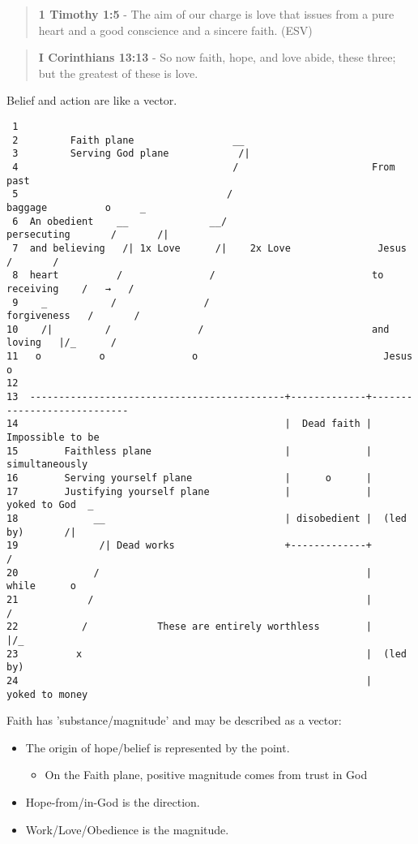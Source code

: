 \documentclass[11pt]{article}
\begin{document}
\begin{quote}
\textbf{1 Timothy 1:5} -  The aim of our charge is love that issues from a pure heart and a good conscience and a sincere faith.  (ESV)
\end{quote}

\begin{quote}
\textbf{I Corinthians 13:13} - So now faith, hope, and love abide, these three; but the greatest of these is love.
\end{quote}

Belief and action are like a vector.

\begin{verbatim}
 1  
 2         Faith plane                 __
 3         Serving God plane            /|
 4                                     /                       From past
 5                                    /                          baggage          o     _
 6  An obedient    __              __/                         persecuting       /       /|
 7  and believing   /| 1x Love      /|    2x Love               Jesus           /       /
 8  heart          /               /                           to receiving    /   →   /
 9    _           /               /                             forgiveness   /       /
10    /|         /               /                             and loving   |/_      /
11   o          o               o                                Jesus              o
12  
13  --------------------------------------------+-------------+----------------------------
14                                              |  Dead faith |    Impossible to be
15        Faithless plane                       |             |     simultaneously
16        Serving yourself plane                |      o      |
17        Justifying yourself plane             |             |   yoked to God  _
18             __                               | disobedient |  (led by)       /|
19              /| Dead works                   +-------------+                /
20             /                                              |    while      o
21            /                                               |              /
22           /            These are entirely worthless        |            |/_
23          x                                                 |  (led by)
24                                                            |   yoked to money
\end{verbatim}

Faith has 'substance/magnitude' and may be described as a vector:
\begin{itemize}
\item The origin of hope/belief is represented by the point.
\begin{itemize}
\item On the Faith plane, positive magnitude comes from trust in God
\end{itemize}
\item Hope-from/in-God is the direction.
\item Work/Love/Obedience is the magnitude.
\end{itemize}
\end{document}
